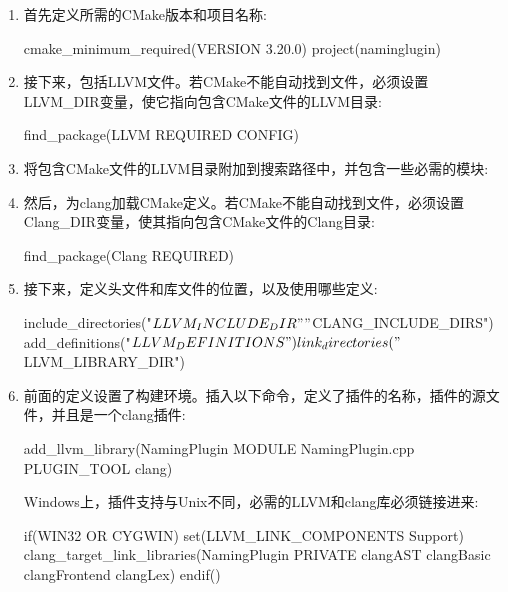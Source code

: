 \begin{enumerate}
\item
首先定义所需的CMake版本和项目名称:

\begin{cmake}
cmake_minimum_required(VERSION 3.20.0)
project(naminglugin)
\end{cmake}

\item
接下来，包括LLVM文件。若CMake不能自动找到文件，必须设置LLVM\_DIR变量，使它指向包含CMake文件的LLVM目录:

\begin{cmake}
find_package(LLVM REQUIRED CONFIG)
\end{cmake}

\item
将包含CMake文件的LLVM目录附加到搜索路径中，并包含一些必需的模块:


\item
然后，为clang加载CMake定义。若CMake不能自动找到文件，必须设置Clang\_DIR变量，使其指向包含CMake文件的Clang目录:

\begin{cmake}
find_package(Clang REQUIRED)
\end{cmake}

\item
接下来，定义头文件和库文件的位置，以及使用哪些定义:

\begin{cmake}
include_directories("${LLVM_INCLUDE_DIR}"
                    "${CLANG_INCLUDE_DIRS}")
add_definitions("${LLVM_DEFINITIONS}")
link_directories("${LLVM_LIBRARY_DIR}")
\end{cmake}

\item
前面的定义设置了构建环境。插入以下命令，定义了插件的名称，插件的源文件，并且是一个clang插件:

\begin{cmake}
add_llvm_library(NamingPlugin MODULE NamingPlugin.cpp
                 PLUGIN_TOOL clang)
\end{cmake}

Windows上，插件支持与Unix不同，必需的LLVM和clang库必须链接进来:

\begin{cmake}
if(WIN32 OR CYGWIN)
    set(LLVM_LINK_COMPONENTS Support)
    clang_target_link_libraries(NamingPlugin PRIVATE
        clangAST clangBasic clangFrontend clangLex)
endif()
\end{cmake}

\end{enumerate}

